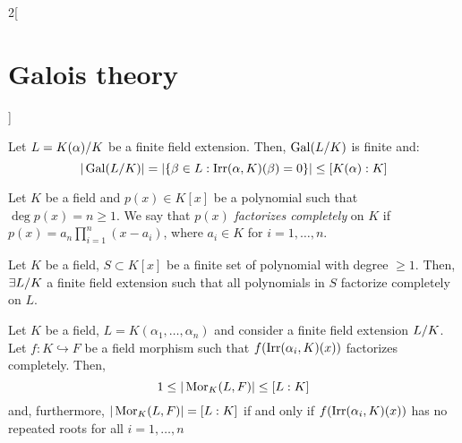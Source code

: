 \documentclass[../../../main.tex]{subfiles}
\begin{document}
\begin{multicols}{2}[\section{Galois theory}]
\begin{corollary}
    Let $L=\quot{K(\alpha)}{K}$ be a finite field extension. Then, $\Gal(\quot{L}{K})$ is finite and: $$\textstyle|\Gal(\quot{L}{K})|=|\{\beta\in L:\irr(\alpha,K)(\beta)=0\}|\leq[K(\alpha):K]$$
  \end{corollary}
  \begin{definition}
    Let $K$ be a field and $p(x)\in K[x]$ be a polynomial such that $\deg p(x)=n\geq 1$. We say that $p(x)$ \textit{factorizes completely} on $K$ if $p(x)=a_n\prod_{i=1}^n(x-a_i)$, where $a_i\in K$ for $i=1,\ldots,n$.
  \end{definition}
  \begin{theorem}
    Let $K$ be a field, $S\subset K[x]$ be a finite set of polynomial with degree $\geq 1$. Then, $\exists \quot{L}{K}$ a finite field extension such that all polynomials in $S$ factorize completely on $L$.
  \end{theorem}
  \begin{theorem}
    Let $K$ be a field, $L=K(\alpha_1,\ldots,\alpha_n)$ and consider a finite field extension $\quot{L}{K}$. Let $f:K\hookrightarrow F$ be a field morphism such that $f(\operatorname{Irr}(\alpha_i,K)(x))$ factorizes completely. Then, $$1\leq|\operatorname{Mor}_K(L,F)|\leq [L:K]$$ and, furthermore, $|\operatorname{Mor}_K(L,F)|=[L:K]$ if and only if $f(\operatorname{Irr}(\alpha_i,K)(x))$ has no repeated roots for all $i=1,\ldots,n$
  \end{theorem}
\end{multicols}
\end{document}
